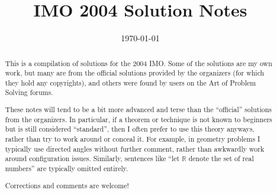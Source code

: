 \documentclass[11pt]{scrartcl}
\title{IMO 2004 Solution Notes}
\date{\today}
\begin{document}
\maketitle

\begin{abstract}
This is a compilation of solutions
for the 2004 IMO.
Some of the solutions are my own work,
but many are from the official solutions provided by the organizers
(for which they hold any copyrights),
and others were found by users on the Art of Problem Solving forums.

These notes will tend to be a bit more advanced and terse than the ``official''
solutions from the organizers.
In particular, if a theorem or technique is not known to beginners
but is still considered ``standard'', then I often prefer to
use this theory anyways, rather than try to work around or conceal it.
For example, in geometry problems I typically use directed angles
without further comment, rather than awkwardly work around configuration issues.
Similarly, sentences like ``let $\mathbb{R}$ denote the set of real numbers''
are typically omitted entirely.

Corrections and comments are welcome!
\end{abstract}

\tableofcontents
\newpage

\addtocounter{section}{-1}
\end{document}
